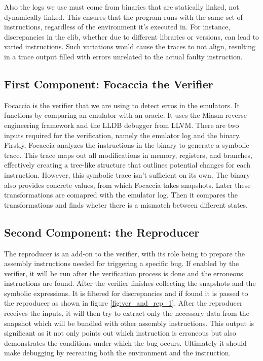 Also the logs we use must come from binaries that are statically linked, not dynamically linked.
This ensures that the program runs with the same set of instructions, regardless of the environment it's executed in.
For instance, discrepancies in the \ac{clib}, whether due to different libraries or versions, can lead to varied instructions.
Such variations would cause the traces to not align, resulting in a trace output filled with errors unrelated to the actual faulty instruction.

\subsection{First Component: Focaccia the Verifier}

Focaccia is the verifier that we are using to detect erros in the emulators.
It functions by comparing an emulator with an oracle.
It uses the Miasm reverse engineering framework and the LLDB debugger from LLVM. 
There are two inputs required for the verification, namely the emulator log and the binary.
Firstly, Focaccia analyzes the instructions in the binary to generate a symbolic trace.
This trace maps out all modifications in memory, registers, and branches, effectively creating a tree-like structure that outlines potential changes for each instruction.
However, this symbolic trace isn't sufficient on its own. 
The binary also provides concrete values, from which Focaccia takes snapshots.
Later these transformations are comapred with the emulator log.
Then it compares the transformations and finds wheter there is a mismatch between different states.

\subsection{Second Component: the Reproducer}
The reproducer is an add-on to the verifier, with its role being to prepare the assembly instructions needed for triggering a specific bug. 
If enabled by the verifier, it will be run after the verification process is done and the erroneous instructions are found.
After the verifier finishes collecting the snapshots and the symbolic expressions.
It is filtered for discrepancies and if found it is passed to the reproducer as shown in figure \ref{fig:ver_and_rep_1}.
After the reproducer receives the inputs, it will then try to extract only the necessary data from the snapshot which will be bundled with other assembly instructions.
This output is significant as it not only points out which instruction is erroneous but also demonstrates the conditions under which the bug occurs.
Ultimately it should make debugging by recreating both the environment and the instruction.

